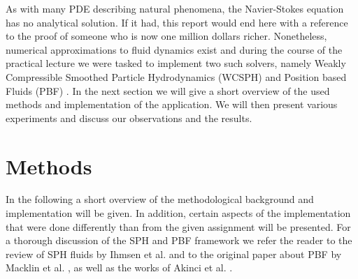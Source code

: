 \documentclass[11pt, letterpaper, twocolumn]{article}
\begin{document}
As with many PDE describing natural phenomena, the Navier-Stokes equation has no analytical solution. If it had, this report would end here with a reference to the proof of someone who is now one million dollars richer. Nonetheless, numerical approximations to fluid dynamics exist and during the course of the practical lecture we were tasked to implement two such solvers, namely Weakly Compressible Smoothed Particle Hydrodynamics (WCSPH) \cite{ihmsen2014} and Position based Fluids (PBF) \cite{macklin2013}. 
In the next section we will give a short overview of the used methods and implementation of the application.
We will then present various experiments and discuss our observations and the results.



\section{Methods} \label{sec:methods}
In the following a short overview of the methodological background and implementation will be given. In addition, certain aspects of the implementation that were done differently than from the given assignment will be presented.
For a thorough discussion of the SPH and PBF framework we refer the reader to the review of SPH fluids by Ihmsen et al. \cite{ihmsen2014} and to the original paper about PBF by Macklin et al. \cite{macklin2013}, as well as the works of Akinci et al. \cite{akinci2012, akinci2013}.
\end{document}
